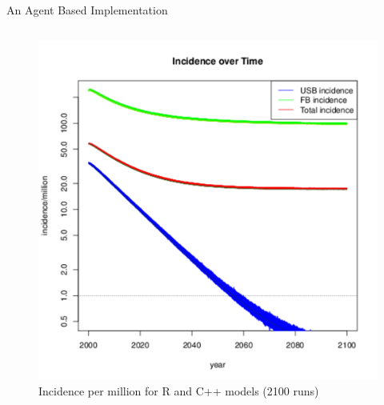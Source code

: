 \documentclass[final]{beamer}
\begin{document}
\begin{frame}
\begin{columns}
\begin{column}{.3\textwidth}
\begin{block}{An Agent Based Implementation}
\begin{block}{}
\begin{column}{.45\textwidth}
\begin{figure}[h]
\begin{center}
                \includegraphics[width=\textwidth]{finalRunSmall}
              \end{center}
              \caption{Incidence per million for R and C++ models (2100 runs)}
              \label{fig:finalRun}
            \end{figure}
          \end{column}
        \end{block}
      \end{block}
    \end{column}
  \end{columns}
\end{frame}
\end{document}
